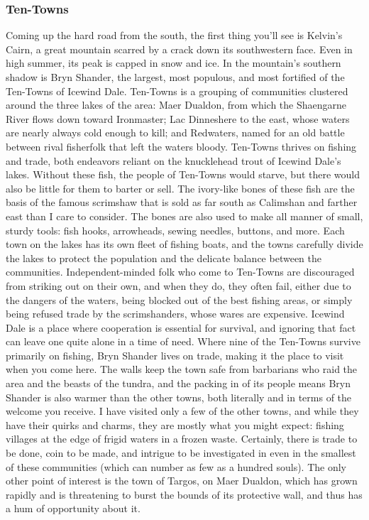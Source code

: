 \documentclass[10pt,a4paper,twoside,twocolumn,openany,bg=print,nodeprecatedcode]{dndbook}
\begin{document}
\subsubsection{Ten-Towns}
Coming up the hard road from the south, the first thing you'll see is Kelvin's Cairn, a great mountain scarred by a crack down its southwestern face. Even in high summer, its peak is capped in snow and ice. In the mountain's southern shadow is Bryn Shander, the largest, most populous, and most fortified of the Ten-Towns of Icewind Dale. Ten-Towns is a grouping of communities clustered around the three lakes of the area: Maer Dualdon, from which the Shaengarne River flows down toward Ironmaster; Lac Dinneshere to the east, whose waters are nearly always cold enough to kill; and Redwaters, named for an old battle between rival fisherfolk that left the waters bloody.
Ten-Towns thrives on fishing and trade, both endeavors reliant on the knucklehead trout of Icewind Dale's lakes. Without these fish, the people of Ten-Towns would starve, but there would also be little for them to barter or sell. The ivory-like bones of these fish are the basis of the famous scrimshaw that is sold as far south as Calimshan and farther east than I care to consider. The bones are also used to make all manner of small, sturdy tools: fish hooks, arrowheads, sewing needles, buttons, and more. Each town on the lakes has its own fleet of fishing boats, and the towns carefully divide the lakes to protect the population and the delicate balance between the communities.
Independent-minded folk who come to Ten-Towns are discouraged from striking out on their own, and when they do, they often fail, either due to the dangers of the waters, being blocked out of the best fishing areas, or simply being refused trade by the scrimshanders, whose wares are expensive. Icewind Dale is a place where cooperation is essential for survival, and ignoring that fact can leave one quite alone in a time of need.
Where nine of the Ten-Towns survive primarily on fishing, Bryn Shander lives on trade, making it the place to visit when you come here. The walls keep the town safe from barbarians who raid the area and the beasts of the tundra, and the packing in of its people means Bryn Shander is also warmer than the other towns, both literally and in terms of the welcome you receive.
I have visited only a few of the other towns, and while they have their quirks and charms, they are mostly what you might expect: fishing villages at the edge of frigid waters in a frozen waste. Certainly, there is trade to be done, coin to be made, and intrigue to be investigated in even in the smallest of these communities (which can number as few as a hundred souls). The only other point of interest is the town of Targos, on Maer Dualdon, which has grown rapidly and is threatening to burst the bounds of its protective wall, and thus has a hum of opportunity about it.
\end{document}
